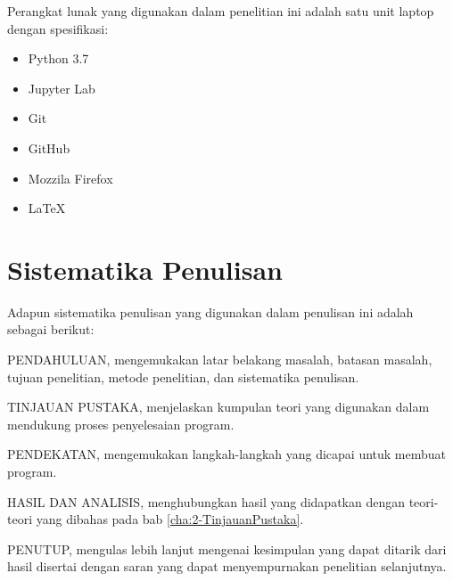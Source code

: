 Perangkat lunak yang digunakan dalam penelitian ini adalah satu unit laptop dengan spesifikasi:
\begin{itemize}
  \item Python 3.7
  \item Jupyter Lab
  \item Git
  \item GitHub
  \item Mozzila Firefox
  \item LaTeX
\end{itemize}

\section{Sistematika Penulisan}
\label{sec:1-SistematikaPenulisan}

Adapun sistematika penulisan yang digunakan dalam penulisan ini adalah sebagai berikut:

PENDAHULUAN, mengemukakan latar belakang masalah, batasan masalah, tujuan penelitian, metode 
penelitian, dan sistematika penulisan.

TINJAUAN PUSTAKA, menjelaskan kumpulan teori yang digunakan dalam mendukung proses penyelesaian 
program.

PENDEKATAN, mengemukakan langkah-langkah yang dicapai untuk membuat program.

HASIL DAN ANALISIS, menghubungkan hasil yang didapatkan dengan teori-teori yang dibahas pada bab
\ref{cha:2-TinjauanPustaka}.

PENUTUP, mengulas lebih lanjut mengenai kesimpulan yang dapat ditarik dari hasil disertai dengan 
saran yang dapat menyempurnakan penelitian selanjutnya.